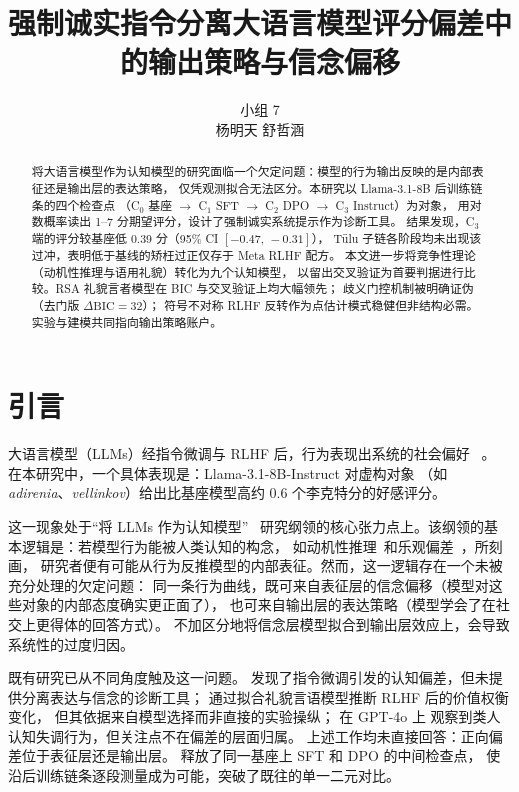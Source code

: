 \documentclass[11pt,a4paper]{ctexart}
\title{强制诚实指令分离大语言模型评分偏差中的输出策略与信念偏移}
\author{小组 7 \\ 杨明天 舒哲涵}
\date{}
\begin{document}
\maketitle

\begin{abstract}
\noindent
将大语言模型作为认知模型的研究面临一个欠定问题：模型的行为输出反映的是内部表征还是输出层的表达策略，
仅凭观测拟合无法区分。本研究以 Llama-3.1-8B 后训练链条的四个检查点
（C$_0$ 基座 $\to$ C$_1$ SFT $\to$ C$_2$ DPO $\to$ C$_3$ Instruct）为对象，
用对数概率读出 1--7 分期望评分，设计了强制诚实系统提示作为诊断工具。
结果发现，C$_3$ 端的评分较基座低 0.39 分（95\% CI $[-0.47,\,-0.31]$），
Tülu 子链各阶段均未出现该过冲，表明低于基线的矫枉过正仅存于 Meta RLHF 配方。
本文进一步将竞争性理论（动机性推理与语用礼貌）转化为九个认知模型，
以留出交叉验证为首要判据进行比较。RSA 礼貌言者模型在 BIC 与交叉验证上均大幅领先；
歧义门控机制被明确证伪（去门版 $\Delta\mathrm{BIC}=32$）；
符号不对称 RLHF 反转作为点估计模式稳健但非结构必需。
实验与建模共同指向输出策略账户。
\end{abstract}

\section{引言}

大语言模型（LLMs）经指令微调与 RLHF 后，行为表现出系统的社会偏好
~\citep{ouyang2022training,lambert2024tulu}。
在本研究中，一个具体表现是：Llama-3.1-8B-Instruct 对虚构对象
（如 \emph{adirenia}、\emph{vellinkov}）给出比基座模型高约 0.6 个李克特分的好感评分。

这一现象处于``将 LLMs 作为认知模型''~\citep[LLMs-as-cognitive-models;][]{binz2023using}
研究纲领的核心张力点上。该纲领的基本逻辑是：若模型行为能被人类认知的构念，
如动机性推理~\citep{kunda1990motivated}和乐观偏差~\citep{sharot2011optimism}，所刻画，
研究者便有可能从行为反推模型的内部表征。然而，这一逻辑存在一个未被充分处理的欠定问题：
同一条行为曲线，既可来自表征层的信念偏移（模型对这些对象的内部态度确实更正面了），
也可来自输出层的表达策略（模型学会了在社交上更得体的回答方式）。
不加区分地将信念层模型拟合到输出层效应上，会导致系统性的过度归因。

既有研究已从不同角度触及这一问题。\citet{itzhak2023instructed}
发现了指令微调引发的认知偏差，但未提供分离表达与信念的诊断工具；
\citet{murthy2025using} 通过拟合礼貌言语模型推断 RLHF 后的价值权衡变化，
但其依据来自模型选择而非直接的实验操纵；\citet{lehr2025kernels} 在 GPT-4o 上
观察到类人认知失调行为，但关注点不在偏差的层面归属。
上述工作均未直接回答：正向偏差位于表征层还是输出层。
\citet{lambert2024tulu} 释放了同一基座上 SFT 和 DPO 的中间检查点，
使沿后训练链条逐段测量成为可能，突破了既往的单一二元对比。
\end{document}
